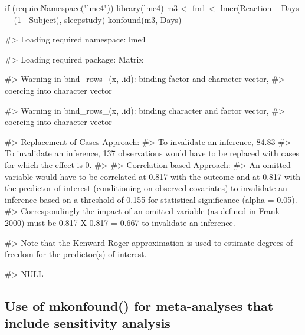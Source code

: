 \begin{Schunk}
\begin{Sinput}
if (requireNamespace("lme4")) {
    library(lme4)
    m3 <- fm1 <- lmer(Reaction ~ Days + (1 | Subject), sleepstudy)
    konfound(m3, Days)
}
\end{Sinput}
\begin{Soutput}
#> Loading required namespace: lme4
\end{Soutput}
\begin{Soutput}
#> Loading required package: Matrix
\end{Soutput}
\begin{Soutput}
#> Warning in bind_rows_(x, .id): binding factor and character vector,
#> coercing into character vector
\end{Soutput}
\begin{Soutput}
#> Warning in bind_rows_(x, .id): binding character and factor vector,
#> coercing into character vector
\end{Soutput}
\begin{Soutput}
#> Replacement of Cases Approach:
#> To invalidate an inference, 84.83% of the estimate would have to be due to bias. This is based on a threshold of 1.588 for statistical significance (alpha = 0.05).
#> To invalidate an inference, 137 observations would have to be replaced with cases for which the effect is 0.
#> 
#> Correlation-based Approach:
#> An omitted variable would have to be correlated at 0.817 with the outcome and at 0.817 with the predictor of interest (conditioning on observed covariates) to invalidate an inference based on a threshold of 0.155 for statistical significance (alpha = 0.05).
#> Correspondingly the impact of an omitted variable (as defined in Frank 2000) must be 0.817 X 0.817 = 0.667 to invalidate an inference.
\end{Soutput}
\begin{Soutput}
#> Note that the Kenward-Roger approximation is used to estimate degrees of freedom for the predictor(s) of interest.
\end{Soutput}
\begin{Soutput}
#> NULL
\end{Soutput}
\end{Schunk}

\hypertarget{use-of-mkonfound-for-meta-analyses-that-include-sensitivity-analysis}{%
\subsection{Use of mkonfound() for meta-analyses that include
sensitivity
analysis}\label{use-of-mkonfound-for-meta-analyses-that-include-sensitivity-analysis}}

